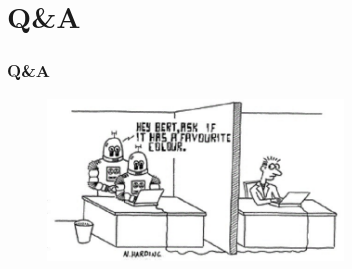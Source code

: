\documentclass{beamer}
\begin{document}
\section{Q\&A}

\begin{frame}
  \frametitle{Q\&A}

  \begin{figure}[!htm]
    \centering
    \includegraphics[width=0.7\textwidth]{turingtest.jpg}
  \end{figure}
\end{frame}
\end{document}
